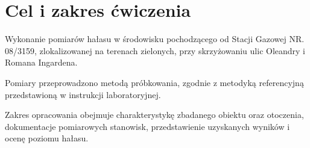 \section{Cel i zakres ćwiczenia}
\label{sec:cel}

Wykonanie pomiarów hałasu w środowisku pochodzącego od Stacji Gazowej NR. 08/3159, zlokalizowanej na terenach zielonych, przy skrzyżowaniu ulic Oleandry i Romana Ingardena. 

Pomiary przeprowadzono metodą próbkowania, zgodnie
z metodyką referencyjną przedstawioną w instrukcji
laboratoryjnej.

Zakres opracowania obejmuje charakterystykę zbadanego obiektu oraz otoczenia, dokumentacje pomiarowych stanowisk, przedstawienie uzyskanych wyników i ocenę poziomu hałasu.

